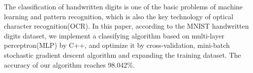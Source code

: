 

\begin{enabstract}
  The classification of handwritten digits is one of the basic problems of machine learning and pattern recognition, 
  which is also the key technology of optical character recognition(OCR). 
  In this paper, according to the MNIST handwritten digits dataset, 
  we implement a classifying algorithm based on multi-layer perceptron(MLP) by C++, 
  and optimize it by cross-validation, mini-batch stochastic gradient descent algorithm 
  and expanding the training dataset. 
  The accuracy of our algorithm reaches 98.042\%.

\end{enabstract}
\par
\vspace*{2em}

